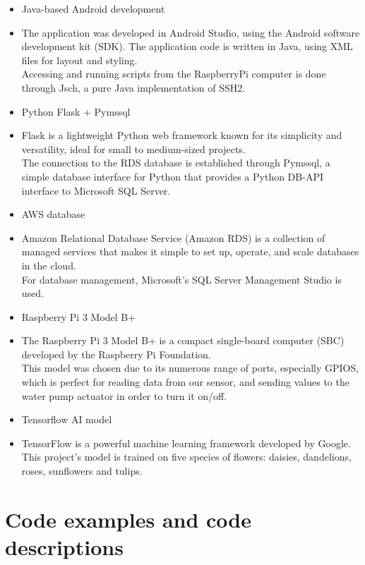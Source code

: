 \documentclass[12pt]{article}
\begin{document}
\begin{itemize}[leftmargin=2cm]
    \item Java-based Android development
    \item[] The application was developed in Android Studio, using the Android software development kit (SDK). The application code is written in Java, using XML files for layout and styling. \\
    Accessing and running scripts from the RaspberryPi computer is done through Jsch, a pure Java implementation of SSH2. 
    \item Python Flask + Pymssql
    \item[] Flask is a lightweight Python web framework known for its simplicity and versatility, ideal for small to medium-sized projects. \\
    The connection to the RDS database is established through Pymssql, a simple database interface for Python that provides a Python DB-API interface to Microsoft SQL Server.
    \item AWS database
    \item[] Amazon Relational Database Service (Amazon RDS) is a collection of managed services that makes it simple to set up, operate, and scale databases in the cloud. \\
    For database management, Microsoft’s SQL Server Management Studio is used.
    \item Raspberry Pi 3 Model B+
    \item[] 
    The Raspberry Pi 3 Model B+ is a compact single-board computer (SBC) developed by the Raspberry Pi Foundation.\\
    This model was chosen due to its numerous range of ports, especially GPIOS, which is perfect for reading data from our sensor, and sending values to the water pump actuator in order to turn it on/off.
    \item Tensorflow AI model
    \item[] TensorFlow is a powerful machine learning framework developed by Google. \\
    This project's model is trained on five species of flowers: daisies, dandelions, roses, sunflowers and tulips.
\end{itemize}

\newpage 
\section{Code examples and code descriptions}
\end{document}
